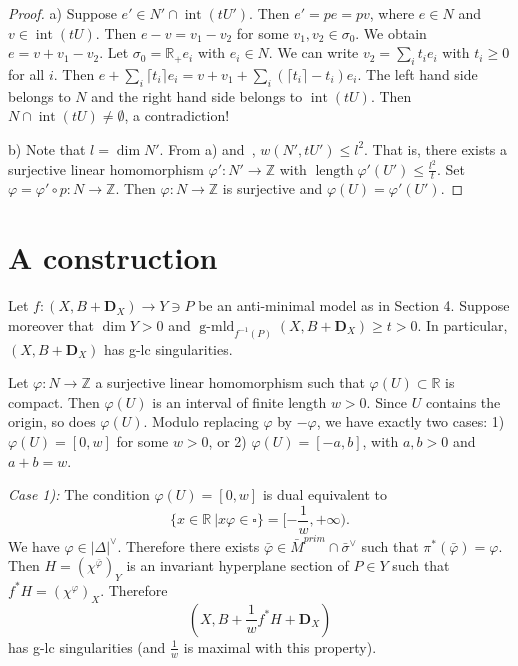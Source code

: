 \documentclass[12pt,twoside]{amsart}
\newcommand{\Z}{{\mathbb Z}}
\newcommand{\R}{{\mathbb R}}
\newcommand{\bD}{{\mathbf D}}
\newcommand{\Int}{\operatorname{int}}
\newcommand{\length}{\operatorname{length}}
\newcommand{\gmld}{\operatorname{g-mld}}
\theoremstyle{plain}
\theoremstyle{definition}
\theoremstyle{remark}
\begin{document}
\begin{proof}
	a) Suppose $e'\in N'\cap \Int(tU')$. Then $e'=pe=pv$, where $e\in N$ and $v\in \Int(tU)$.
	Then $e-v=v_1-v_2$ for some $v_1,v_2\in \sigma_0$. We obtain $e=v+v_1-v_2$.
	Let $\sigma_0=\R_+e_i$ with $e_i\in N$. We can write $v_2=\sum_it_ie_i$ with $t_i\ge 0$ for all $i$.
	Then $e+\sum_i\lceil t_i\rceil e_i=v+v_1+\sum_i(\lceil t_i\rceil-t_i)e_i$. The left hand side belongs to
	$N$ and the right hand side belongs to $\Int(tU)$. Then $N\cap \Int(tU)\ne \emptyset$,
	a contradiction!
	
	b) Note that $l=\dim N'$. From a) and~\cite[Theorem 5.2]{AI20}, $w(N',tU')\le l^2$. 
	That is, there exists a surjective linear homomorphism $\varphi' \colon N' \to \Z$ with 
	$\length \varphi'(U')\le \frac{l^2}{t}$. Set $\varphi=\varphi'\circ p\colon N\to \Z$.
	Then $\varphi\colon N\to \Z$ is surjective and $\varphi(U)=\varphi'(U')$. 
\end{proof}



\section{A construction}


Let $f\colon (X,B+\bD_X)\to Y\ni P$ be an anti-minimal model as in Section 4.
Suppose moreover that $\dim Y>0$ and $\gmld_{f^{-1}(P)}(X,B+\bD_X)\ge t>0$. In particular, 
$(X,B+\bD_X)$ has g-lc singularities.

Let $\varphi\colon N\to \Z$ a surjective linear homomorphism such that $\varphi(U)\subset \R$
is compact. Then $\varphi(U)$ is an interval of finite length $w>0$. Since $U$ contains the origin,
so does $\varphi(U)$. Modulo replacing $\varphi$ by $-\varphi$, we have exactly two 
cases: 1) $\varphi(U)=[0,w]$ for some $w>0$, or 2) $\varphi(U)=[-a,b]$,  with $a,b>0$ and 
$a+b=w$.

{\em Case 1):} The condition $\varphi(U)=[0,w]$ is dual equivalent to 
$$
\{x\in \R\  | x\varphi\in \square \}=[-\frac{1}{w},+\infty).
$$
We have $\varphi\in |\Delta|^\vee$.
Therefore there exists $\bar{\varphi}\in \bar{M}^{prim}\cap {\bar{\sigma}}^\vee$ such that
$\pi^*(\bar{\varphi}) =\varphi$. Then $H=(\chi^{\bar{\varphi}})_Y$ is an invariant hyperplane section 
of $P\in Y$ such that $f^*H=(\chi^{\varphi})_X$. Therefore
$$
(X,B+\frac{1}{w} f^*H+\bD_X)
$$ 
has g-lc singularities (and $\frac{1}{w}$ is maximal with this property).
\end{document}
